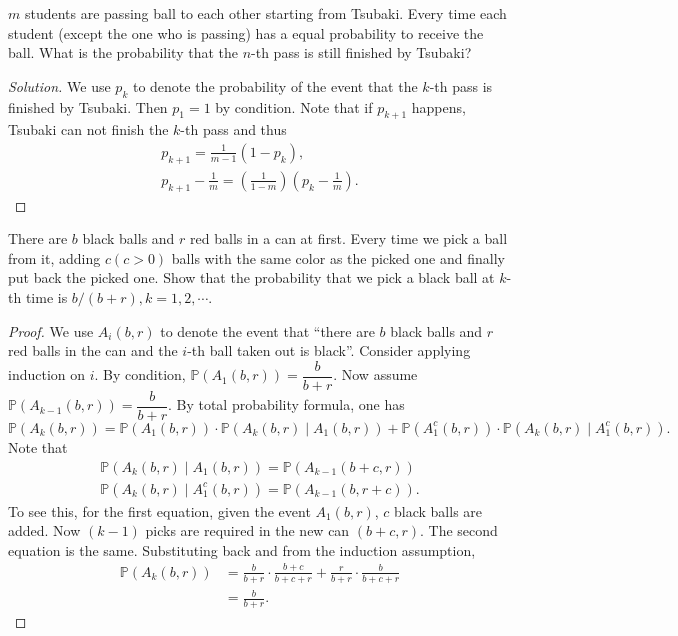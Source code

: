\documentclass[11pt,singlecolumn, openany, citestyle=authoryear]{elegantbook}
\begin{document}
\begin{CJK}{UTF8}{gbsn}
\begin{exercise}
    $m$ students are passing ball to each other starting from Tsubaki. 
    Every time each student (except the one who is passing) has a equal probability
    to receive the ball. What is the probability that the $n$-th pass is 
    still finished by Tsubaki? 
\end{exercise}
\begin{proof}[Solution]
    We use $p_k$ to denote the probability of the event that the $k$-th pass is finished by Tsubaki. 
    Then $p_1 = 1$ by condition.
    Note that if $p_{k+1}$ happens, Tsubaki can not finish the $k$-th pass and thus 
\begin{gather*}
    p_{k+1} = \frac{1}{m-1}(1-p_{k}),\\
    p_{k+1} - \frac{1}{m} = (\frac{1}{1-m})(p_k-\frac{1}{m}).
\end{gather*}
\end{proof}

\begin{exercise}
    There are $b$ black balls and $r$ red balls in a can at first. Every time we pick
    a ball from it, adding $c(c > 0)$ balls with the same color as the picked one and finally 
    put back the picked one. Show that the probability that we pick a black ball at 
    $k$-th time is $b/(b+r), k = 1,2,\cdots$.
\end{exercise}
\begin{proof}
    We use $A_i(b,r)$ to denote the event that ``there are $b$ black balls and 
    $r$ red balls in the can and the $i$-th ball taken out is black''. 
    Consider applying induction on $i$.
    By condition, $\mathbb{P}(A_1(b,r)) = \dfrac{b}{b+r}$.
    Now assume $\mathbb{P}(A_{k-1}(b,r)) = \dfrac{b}{b+r}$.
    By total probability formula, one has 
    $$
    \mathbb{P}(A_k(b,r)) = \mathbb{P}(A_1(b,r)) \cdot  \mathbb{P}(A_k(b,r)\mid A_1(b,r))
    + \mathbb{P}(A_1^c(b,r)) \cdot  \mathbb{P}(A_k(b,r)\mid A_1^c(b,r)).
    $$
    Note that 
    \begin{align*}
        \mathbb{P}(A_k(b,r)\mid A_1(b,r)) = \mathbb{P}(A_{k-1}(b+c,r))\\
        \mathbb{P}(A_k(b,r)\mid A_1^c(b,r)) = \mathbb{P}(A_{k-1}(b,r+c)).
    \end{align*}
    To see this, for the first equation, given the event $A_1(b,r)$, $c$ black balls 
    are added. Now $(k-1)$ picks are required in the new can $(b+c,r)$. The second equation is the same. 
    Substituting back and from the induction assumption,
    \begin{align*}
        \mathbb{P}(A_k(b,r)) &= \frac{b}{b+r}\cdot \frac{b+c}{b+c+r} + 
        \frac{r}{b+r}\cdot \frac{b}{b+c+r}\\
        &= \frac{b}{b+r}.
    \end{align*}
\end{proof}


\end{CJK}
\end{document}

